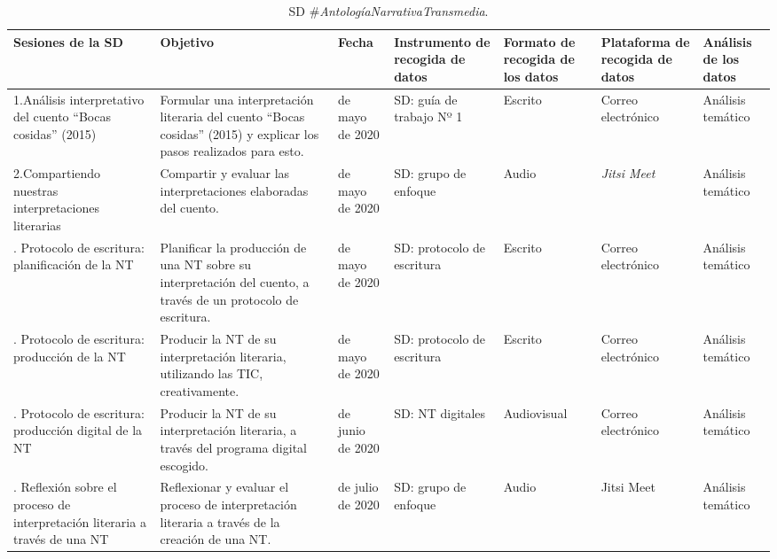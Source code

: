 \documentclass[spanish]{textolivre}
\begin{document}
\begin{table}[h!]
\centering \small
\begin{threeparttable}
\caption{SD \#\textit{AntologíaNarrativaTransmedia}.}
\label{tab01}
\begin{tabular}{
    >{\raggedright\arraybackslash}p{2cm} 
    >{\raggedright\arraybackslash}p{2.5cm} 
    >{\raggedright\arraybackslash}p{1.2cm} 
    >{\raggedright\arraybackslash}p{2cm} 
    >{\raggedright\arraybackslash}p{1.5cm} 
    >{\raggedright\arraybackslash}p{1.5cm} 
    >{\raggedright\arraybackslash}p{1.5cm}
    }
\toprule
 \textbf{Sesiones de la SD} & \textbf{Objetivo} & \textbf{Fecha} & \textbf{Instrumento de recogida de datos} & \textbf{Formato de recogida de los datos} & \textbf{Plataforma de recogida de datos} & \textbf{Análisis de los datos} \\
 \midrule
1.Análisis interpretativo del cuento “Bocas cosidas” (2015)
& Formular una interpretación literaria del cuento “Bocas cosidas” (2015) y explicar los pasos realizados para esto. &
06 de mayo de 2020 & SD: guía de trabajo Nº 1 & Escrito & Correo electrónico & Análisis temático \\
2.Compartiendo nuestras interpretaciones literarias & Compartir y evaluar las interpretaciones elaboradas del cuento. & 09 de mayo de 2020 & SD: grupo de enfoque  & Audio & \textit{Jitsi Meet} & Análisis temático \\
3. Protocolo de escritura: planificación de la NT & Planificar la producción de una NT sobre su interpretación del cuento, a través de un protocolo de escritura. & 20 de mayo de 2020 & SD: protocolo de escritura & Escrito & Correo electrónico & Análisis temático \\
4. Protocolo de escritura: producción de la NT & Producir la NT de su interpretación literaria, utilizando las TIC, creativamente. & 20 de mayo de 2020 & SD: protocolo de escritura  & Escrito & Correo electrónico & Análisis temático \\
5. Protocolo de escritura: producción digital de la NT & Producir la NT de su interpretación literaria, a través del programa digital escogido. & 12 de junio de 2020 & SD: NT digitales  & Audiovisual & Correo electrónico & Análisis temático \\
6. Reflexión sobre el proceso de interpretación literaria a través de una NT & Reflexionar y evaluar el proceso de interpretación literaria a través de la creación de una NT. & 14 de julio de 2020 & SD: grupo de enfoque & Audio & Jitsi Meet & Análisis temático \\
\bottomrule
\end{tabular}
\end{threeparttable}
\end{table}
\end{document}
